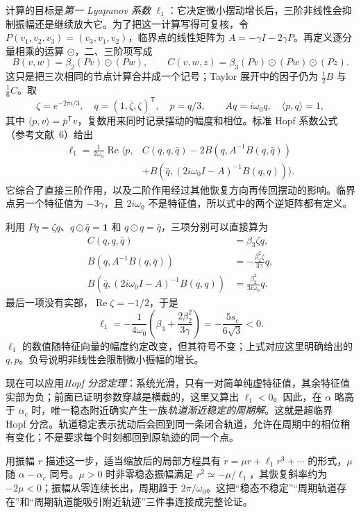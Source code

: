 计算的目标是\emph{第一 Lyapunov 系数} $\ell_1$：它决定微小摆动增长后，三阶非线性会抑制振幅还是继续放大它。为了把这一计算写得可复核，令 $P(v_1,v_2,v_3)=(v_3,v_1,v_2)$，临界点的线性矩阵为 $A=-\gamma I-2\gamma P$。再定义逐分量相乘的运算 $\odot$，二、三阶项写成
\[
B(v,w)=\beta_2(Pv)\odot(Pw),\qquad
C(v,w,z)=\beta_3(Pv)\odot(Pw)\odot(Pz).
\]
这只是把三次相同的节点计算合并成一个记号；Taylor 展开中的因子仍为 $\frac12B$ 与 $\frac16C$。取
\[
\zeta=e^{-2\pi i/3},\quad q=(1,\bar\zeta,\zeta)^{\mathsf T},\quad
p=q/3,\qquad Aq=i\omega_0q,
\quad \langle p,q\rangle=1,
\]
其中 $\langle p,v\rangle=\bar p^{\mathsf T}v$，复数用来同时记录摆动的幅度和相位。标准 Hopf 系数公式（参考文献~6）给出
\begin{align*}
\ell_1=\frac1{2\omega_0}\operatorname{Re}\big\langle p,
&C(q,q,\bar q)-2B(q,A^{-1}B(q,\bar q))\\
&+B(\bar q,(2i\omega_0I-A)^{-1}B(q,q))\big\rangle.
\end{align*}
它综合了直接三阶作用，以及二阶作用经过其他恢复方向再传回摆动的影响。临界点另一个特征值为 $-3\gamma$，且 $2i\omega_0$ 不是特征值，所以式中的两个逆矩阵都有定义。

利用 $Pq=\zeta q$、$q\odot\bar q=\bm1$ 和 $q\odot q=\bar q$，三项分别可以直接算为
\[
\begin{split}
C(q,q,\bar q)&=\beta_3\zeta q,\\
B(q,A^{-1}B(q,\bar q))&=-\frac{\beta_2^2\zeta}{3\gamma}q,\\
B(\bar q,(2i\omega_0I-A)^{-1}B(q,q))&=\frac{\beta_2^2}{3i\omega_0}q.
\end{split}
\]
最后一项没有实部，$\operatorname{Re}\zeta=-1/2$，于是
\[
\ell_1=-\frac1{4\omega_0}
\left(\beta_3+\frac{2\beta_2^2}{3\gamma}\right)
=-\frac{5s_c}{6\sqrt3}<0.
\]
$\ell_1$ 的数值随特征向量的幅度约定改变，但其符号不变；上式对应这里明确给出的 $q,p$。负号说明非线性会限制微小振幅的增长。

现在可以应用\emph{Hopf 分岔定理}：系统光滑，只有一对简单纯虚特征值，其余特征值实部为负；前面已证明参数穿越是横截的，这里又算出 $\ell_1<0$。因此，在 $\alpha$ 略高于 $\alpha_c$ 时，唯一稳态附近确实产生一族\emph{轨道渐近稳定的周期解}。这就是超临界 Hopf 分岔。轨道稳定表示扰动后会回到同一条闭合轨道，允许在周期中的相位稍有变化；不是要求每个时刻都回到原轨迹的同一个点。

用振幅 $r$ 描述这一步，适当缩放后的局部方程具有 $\dot r=\mu r+\ell_1r^3+\cdots$ 的形式，$\mu$ 随 $\alpha-\alpha_c$ 同号。$\mu>0$ 时非零稳态振幅满足 $r^2\simeq-\mu/\ell_1$，其恢复斜率约为 $-2\mu<0$；振幅从零连续长出，周期趋于 $2\pi/\omega_0$。这把“稳态不稳定”“周期轨道存在”和“周期轨道能吸引附近轨迹”三件事连接成完整论证。

